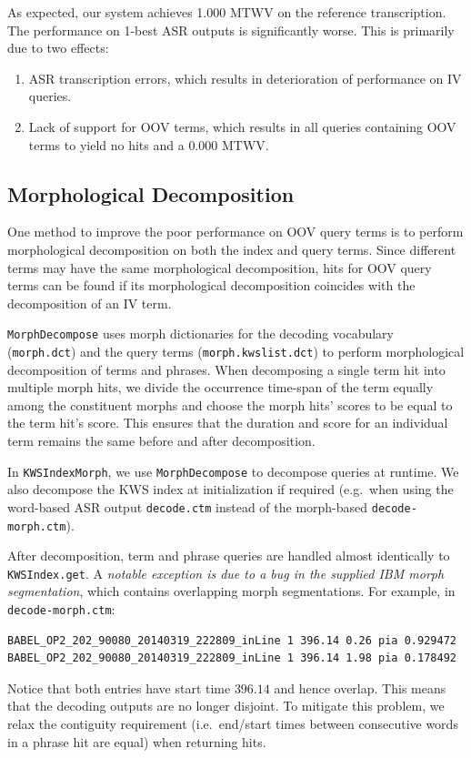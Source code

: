 \documentclass[a4paper,oneside,reqno]{amsart}
\begin{document}
As expected, our system achieves 1.000 MTWV on the reference transcription.
The performance on 1-best ASR outputs is significantly worse. This is primarily
due to two effects:
\begin{enumerate}
  \item ASR transcription errors, which results in deterioration of performance on IV queries.
  \item Lack of support for OOV terms, which results in all queries containing OOV
    terms to yield no hits and a $0.000$ MTWV.
\end{enumerate}

\subsection{Morphological Decomposition}

One method to improve the poor performance on OOV query terms is to perform
morphological decomposition on both the index and query
terms\cite{narasimhan2014morphological}. Since different terms may have the
same morphological decomposition, hits for OOV query terms can be found if its
morphological decomposition coincides with the decomposition of an IV term.

\texttt{MorphDecompose} uses morph dictionaries for the decoding vocabulary
(\texttt{morph.dct}) and the query terms (\texttt{morph.kwslist.dct}) to
perform morphological decomposition of terms and phrases. When decomposing a
single term hit into multiple morph hits, we divide the occurrence time-span of
the term equally among the constituent morphs and choose the morph hits'
scores to be equal to the term hit's score. This ensures that the duration and
score for an individual term remains the same before and after decomposition.

In \texttt{KWSIndexMorph}, we use \texttt{MorphDecompose} to decompose queries
at runtime.  We also decompose the KWS index at initialization if required
(e.g.\ when using the word-based ASR output \texttt{decode.ctm} instead of the
morph-based \texttt{decode-morph.ctm}).

After decomposition, term and phrase queries are handled almost identically to
\texttt{KWSIndex.get}. A \emph{notable exception is due to a bug in the
supplied IBM morph segmentation}, which contains overlapping morph
segmentations. For example, in \texttt{decode-morph.ctm}:
\begin{lstlisting}[firstnumber=101748]
BABEL_OP2_202_90080_20140319_222809_inLine 1 396.14 0.26 pia 0.929472
BABEL_OP2_202_90080_20140319_222809_inLine 1 396.14 1.98 pia 0.178492
\end{lstlisting}
Notice that both entries have start time $396.14$ and hence overlap.
This means that the decoding outputs are no longer disjoint. To mitigate
this problem, we relax the contiguity requirement (i.e.\ end/start times between
consecutive words in a phrase hit are equal) when returning hits.
\end{document}
